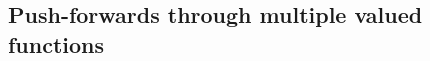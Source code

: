 \documentclass[a4paper,11pt,reqno]{amsart}
\newtheorem{proposition}[theorem]{Proposition}
\theoremstyle{definition}
\numberwithin{equation}{section}
\numberwithin{subsection}{section}
\newcommand{\R}{\mathbb{R}}
\newcommand{\M}{\mathbf{M}}
\newcommand{\I}{\mathscr{I}}
\newcommand{\Fl}{\mathbf{F}}
\newcommand{\F}{\mathscr{F}}
\newcommand{\spt}{\mathrm{spt}}
\begin{document}
%
%
%
%
%
%

\subsection{Push-forwards through multiple valued functions} \label{sec:pf}
\end{document}
